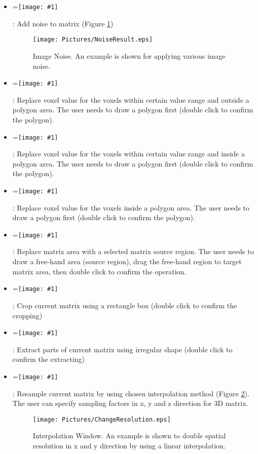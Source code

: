 \documentclass{book}%
\newcommand{\vcenteredinclude}[1]{
\begingroup
\setbox0=\hbox{\texttt{[image: \#1]}}
\parbox{\wd0}{\box0}\endgroup}
\begin{document}
\begin{enumerate}
\begin{itemize}
		
		\item \vcenteredinclude{Pictures/Noise.eps} : Add noise to matrix (Figure \ref{fig:NoiseResult})
		
	\begin{figure}[htbp]
		\centering
			\texttt{[image: Pictures/NoiseResult.eps]}
		\caption{Image Noise. An example is shown for applying various image noise.}
		\label{fig:NoiseResult}
	\end{figure}
		
		
		\item \vcenteredinclude{Pictures/FillOut.eps} : Replace voxel value for the voxels within certain value range and outside a polygon area. The user needs to draw a polygon first (double click to confirm the polygon).
		\item \vcenteredinclude{Pictures/FillIn.eps} : Replace voxel value for the voxels within certain value range and inside a polygon area. The user needs to draw a polygon first (double click to confirm the polygon).
		\item \vcenteredinclude{Pictures/Fill.eps} : Replace voxel value for the voxels inside a polygon area. The user needs to draw a polygon first (double click to confirm the polygon).
		\item \vcenteredinclude{Pictures/Replace.eps} : Replace matrix area with a selected matrix source region. The user needs to draw a free-hand area (source region), drag the free-hand region to target matrix area, then double click to confirm the operation.
		\item \vcenteredinclude{Pictures/Crop.eps} : Crop current matrix using a rectangle box (double click to confirm the cropping)
		\item \vcenteredinclude{Pictures/Extract.eps} : Extract parts of current matrix using irregular shape (double click to confirm the extracting)
		\item \vcenteredinclude{Pictures/Resolution.eps} : Resample current matrix by using chosen interpolation method (Figure \ref{fig:ChangeResolution}). The user can specify sampling factors in x, y and z direction for 3D matrix.
		
	\begin{figure}[htbp]
		\centering
			\texttt{[image: Pictures/ChangeResolution.eps]}
		\caption{Interpolation Window. An example is shown to double spatial resolution in x and y direction by using a linear interpolation.}
		\label{fig:ChangeResolution}
	\end{figure}
		

\end{itemize}
\end{enumerate}
\end{document}
